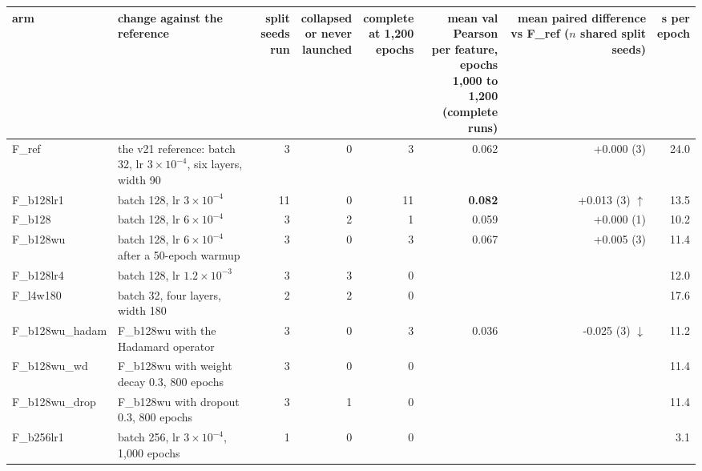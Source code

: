 \begin{tabular}{@{}lp{46mm}rrrrrr@{}}
\toprule
arm & change against the reference & \shortstack[r]{split\\seeds\\run} & \shortstack[r]{collapsed\\or never\\launched} & \shortstack[r]{complete\\at 1{,}200\\epochs} & \shortstack[r]{mean val Pearson\\per feature, epochs\\1{,}000 to 1{,}200\\(complete runs)} & \shortstack[r]{mean paired\\difference vs F\_ref\\($n$ shared split seeds)} & \shortstack[r]{s per\\epoch} \\
\midrule
F\_ref & the v21 reference: batch 32, lr $3\times10^{-4}$, six layers, width 90 & 3 & 0 & 3 & 0.062 & +0.000 (3) & 24.0 \\
F\_b128lr1 & batch 128, lr $3\times10^{-4}$ & 11 & 0 & 11 & \textbf{0.082} & +0.013 (3) $\uparrow$ & 13.5 \\
F\_b128 & batch 128, lr $6\times10^{-4}$ & 3 & 2 & 1 & 0.059 & +0.000 (1) & 10.2 \\
F\_b128wu & batch 128, lr $6\times10^{-4}$ after a 50-epoch warmup & 3 & 0 & 3 & 0.067 & +0.005 (3) & 11.4 \\
F\_b128lr4 & batch 128, lr $1.2\times10^{-3}$ & 3 & 3 & 0 &  &  & 12.0 \\
F\_l4w180 & batch 32, four layers, width 180 & 2 & 2 & 0 &  &  & 17.6 \\
F\_b128wu\_hadam & F\_b128wu with the Hadamard operator & 3 & 0 & 3 & 0.036 & -0.025 (3) $\downarrow$ & 11.2 \\
F\_b128wu\_wd & F\_b128wu with weight decay 0.3, 800 epochs & 3 & 0 & 0 &  &  & 11.4 \\
F\_b128wu\_drop & F\_b128wu with dropout 0.3, 800 epochs & 3 & 1 & 0 &  &  & 11.4 \\
F\_b256lr1 & batch 256, lr $3\times10^{-4}$, 1{,}000 epochs & 1 & 0 & 0 &  &  & 3.1 \\
\bottomrule
\end{tabular}

